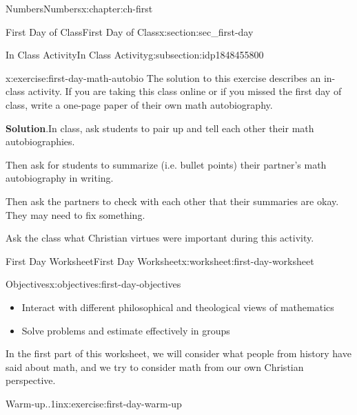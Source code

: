 \documentclass[twoside,10pt,]{book}
\newcommand{\blocktitlefont}{\relax}
\numberwithin{equation}{chapter}
\begin{document}
\begin{chapterptx}{Numbers}{}{Numbers}{}{}{x:chapter:ch-first}
\begin{sectionptx}{First Day of Class}{}{First Day of Class}{}{}{x:section:sec_first-day}
\begin{introduction}{}
\end{introduction}%
%
%
\typeout{************************************************}
\typeout{************************************************}
%
\begin{subsectionptx}{In Class Activity}{}{In Class Activity}{}{}{g:subsection:idp1848455800}
\begin{inlineexercise}{}{x:exercise:first-day-math-autobio}%
The solution to this exercise describes an in-class activity.  If you are taking this class online or if you missed the first day of class, write a one-page paper of their own math autobiography.\par\smallskip%
\noindent\textbf{\blocktitlefont Solution}.\hypertarget{g:solution:idp1848468216}{}\quad{}In class, ask students to pair up and tell each other their math autobiographies.%
\par
Then ask for students to summarize (i.e. bullet points) their partner's math autobiography in writing.%
\par
Then ask the partners to check with each other that their summaries are okay.  They may need to fix something.%
\par
Ask the class what Christian virtues were important during this activity.%
\end{inlineexercise}%
\end{subsectionptx}
%
%
\typeout{************************************************}
\typeout{************************************************}
%
\begin{worksheet-subsection}{First Day Worksheet}{}{First Day Worksheet}{}{}{x:worksheet:first-day-worksheet}
\begin{objectives}{Objectives}{x:objectives:first-day-objectives}
%
\begin{itemize}[label=\textbullet]
\item{}Interact with different philosophical and theological views of mathematics%
\item{}Solve problems and estimate effectively in groups%
\end{itemize}
\end{objectives}
In the first part of this worksheet, we will consider what people from history have said about math, and we try to consider math from our own Christian perspective.%
\begin{divisionexercise}{1}{Warm-up..}{1in}{x:exercise:first-day-warm-up}%

\end{divisionexercise}
\end{worksheet-subsection}
\end{sectionptx}
\end{chapterptx}
\end{document}
